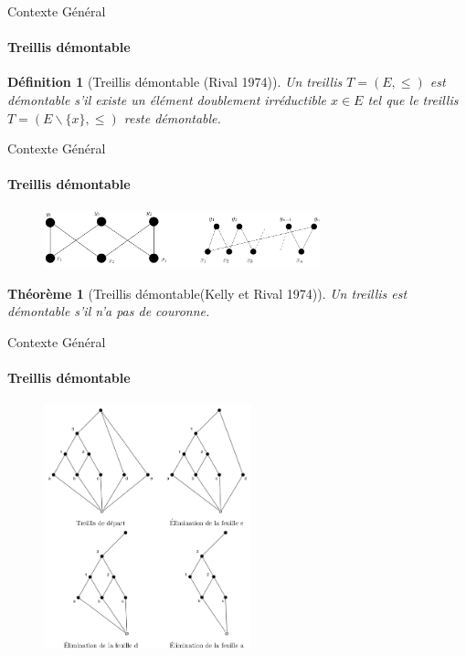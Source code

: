 \documentclass{beamer}
\newtheorem{de}{Définition}
\newtheorem{theo}{Théorème}
\begin{document}
  \begin{frame}{Contexte Général}
  \framesubtitle{Treillis démontable}
	\begin{de}[Treillis démontable (Rival 1974)]
	Un treillis $T = (E, \leq)$ est démontable s'il existe un élément doublement irréductible $x \in E$ tel que 
	le treillis $T = (E \backslash \{x\}, \leq)$ reste démontable.
	\end{de}
  \end{frame}

  \begin{frame}{Contexte Général}
  \framesubtitle{Treillis démontable}
   \begin{figure}
	\includegraphics[width=8cm]{images/3c.png} 
    \end{figure}

	\begin{theo}[Treillis démontable(Kelly et Rival 1974)]
	Un treillis est démontable s'il n'a pas de couronne.
	\end{theo}
  \end{frame}

  \begin{frame}{Contexte Général}
  \framesubtitle{Treillis démontable}
   \begin{figure}
	\includegraphics[width=6cm]{images/e_tr_1.png} 
    \end{figure}
  \end{frame}
\end{document}
